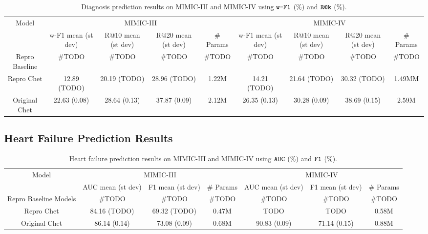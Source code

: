 \documentclass[11pt,a4paper,fleqn]{article}
\begin{document}
\begin{table}[H]
\centering
\begin{tabular}{|c|c|c|c|c|c|c|c|c|}
\hline
{Model} & \multicolumn{4}{c|}{MIMIC-III} & \multicolumn{4}{c|}{MIMIC-IV} \\ \cline{2-9} 
 & w-F1 mean (st dev) & R@10 mean (st dev) & R@20 mean (st dev) & \# Params & w-F1 mean (st dev) & R@10 mean (st dev) & R@20 mean (st dev) & \# Params \\ \hline
{Repro Baseline} & \#TODO & \#TODO & \#TODO & \#TODO & \#TODO & \#TODO & \#TODO & \#TODO \\ \cline{1-9}
{Repro Chet} & 12.89 (TODO) & 20.19 (TODO) & 28.96 (TODO) & 1.22M & 14.21 (TODO) & 21.64 (TODO) & 30.32 (TODO) & 1.49MM \\ \cline{1-9}
{Original Chet} & 22.63 (0.08) & 28.64 (0.13) & 37.87 (0.09) & 2.12M & 26.35 (0.13) & 30.28 (0.09) & 38.69 (0.15) & 2.59M \\ \cline{1-9}
\end{tabular}
\caption{Diagnosis prediction results on MIMIC-III and MIMIC-IV using $\verb|w-F1|$ (\%) and $\verb|R@k|$ (\%).}
\label{tab:diag}
\end{table}

\subsection{Heart Failure Prediction Results}
\begin{table}[H]
\centering
\begin{tabular}{|c|c|c|c|c|c|c|}
\hline
{Model} & \multicolumn{3}{c|}{MIMIC-III} & \multicolumn{3}{c|}{MIMIC-IV} \\ \cline{2-7} 
 & AUC mean (st dev) & F1 mean (st dev) & \# Params & AUC mean (st dev) & F1 mean (st dev) & \# Params \\ \hline
{Repro Baseline Models} & \#TODO & \#TODO & \#TODO & \#TODO & \#TODO & \#TODO \\ \cline{1-7}
{Repro Chet} & 84.16 (TODO) & 69.32 (TODO) & 0.47M & TODO & TODO & 0.58M \\ \cline{1-7}
{Original Chet} & 86.14 (0.14) & 73.08 (0.09) & 0.68M & 90.83 (0.09) & 71.14 (0.15) & 0.88M \\ \cline{1-7}
\end{tabular}
\caption{Heart failure prediction results on MIMIC-III and MIMIC-IV using $\verb|AUC|$ (\%) and $\verb|F1|$ (\%).}
\label{tab:hf}
\end{table}
\end{document}
